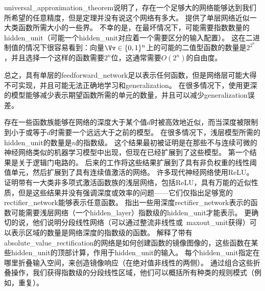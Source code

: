 \gls{universal_approximation_theorem}说明了，存在一个足够大的网络能够达到我们所希望的任意精度，但是定理并没有说这个网络有多大。
\cite{Barron-1993}提供了单层网络近似一大类函数所需大小的一些界。
不幸的是，在最坏情况下，可能需要指数数量的\gls{hidden_unit}（可能一个\gls{hidden_unit}对应着一个需要区分的输入配置）。
这在二进制值的情况下很容易看到：向量$\Vv \in \{0,1\}^n$上的可能的二值型函数的数量是$2^{2^n}$，并且选择一个这样的函数需要$2^n$位，这通常需要$O(2^n)$的自由度。

总之，具有单层的\gls{feedforward_network}足以表示任何函数，但是网络层可能大得不可实现，并且可能无法正确地学习和\gls{generalization}。
在很多情况下，使用更深的模型能够减少表示期望函数所需的单元的数量，并且可以减少\gls{generalization}误差。


存在一些函数族能够在网络的深度大于某个值$d$时被高效地近似，而当深度被限制到小于或等于$d$时需要一个远远大于之前的模型。
在很多情况下，浅层模型所需的\gls{hidden_unit}的数量是$n$的指数级。
这个结果最初被证明是在那些不与连续可微的神经网络类似的机器学习模型中出现，但现在已经扩展到了这些模型。
第一个结果是关于逻辑门电路的\citep{Hastad-1986}。
后来的工作将这些结果扩展到了具有非负权重的线性阈值单元\citep{Hastad-Goldmann-1991,Hajnal-et-al-1993}，然后扩展到了具有连续值激活的网络\citep{Maass-1992,Maass-et-al-1994}。
许多现代神经网络使用\gls{ReLU}。
\cite{Leshno-et-al-1993}证明带有一大类非多项式激活函数族的浅层网络，包括\gls{ReLU}，具有万能的近似性质，但是这些结果并没有强调深度或效率的问题——它们仅指出足够宽的\gls{rectifier_network}能够表示任意函数。
\cite{Montufar-et-al-2014}指出一些用深度\gls{rectifier_network}表示的函数可能需要浅层网络（一个\gls{hidden_layer}）指数级的\gls{hidden_unit}才能表示。
更确切的说，他们说明分段线性网络（可以通过整流非线性或~\gls{maxout_unit}获得）可以表示区域的数量是网络深度的指数级的函数。%
解释了带有\gls{absolute_value_rectification}的网络是如何创建函数的镜像图像的，这些函数在某些\gls{hidden_unit}的顶部计算，作用于\gls{hidden_unit}的输入。
每个\gls{hidden_unit}指定在哪里折叠输入空间，来创造镜像响应（在绝对值非线性的两侧）。
通过组合这些折叠操作，我们获得指数级的分段线性区域，他们可以概括所有种类的规则模式（例如，重复）。
